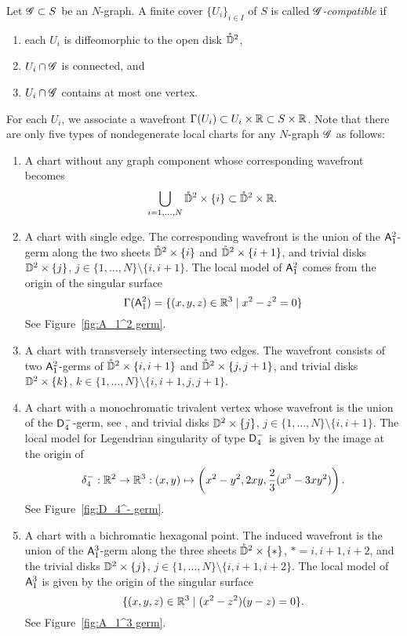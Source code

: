 Let $\mathscr{G}\subset S$ be an $N$-graph.
A finite cover $\{U_i\}_{i\in I}$ of $S$ is called {\em $\mathscr{G}$-compatible} if
\begin{enumerate}
\item each $U_i$ is diffeomorphic to the open disk $\mathring{\mathbb{D}}^2$,
\item $U_i \cap \mathscr{G}$ is connected, and
\item $U_i \cap \mathscr{G}$ contains at most one vertex.
\end{enumerate}

For each $U_i$, we associate a wavefront $\Gamma(U_i)\subset U_i\times \mathbb{R} \subset S\times \mathbb{R}$.
Note that there are only five types of nondegenerate local charts for any $N$-graph $\mathscr{G}$ as follows:
\begin{enumerate}[Type 1]
\item A chart without any graph component whose corresponding wavefront becomes
\[
\bigcup_{i=1,\dots,N}\mathring{\mathbb{D}}^2\times\{i\}\subset \mathring{\mathbb{D}}^2\times \mathbb{R}.
\]

\item A chart with single edge. The corresponding wavefront is the union of the $\mathsf{A}_1^2$-germ along the two sheets $\mathring{\mathbb{D}}^2\times \{i\}$ and $\mathring{\mathbb{D}}^2\times\{i+1\}$, and trivial disks $\mathbb{D}^2\times\{j\}$, $j\in \{1,\dots,N\}\setminus\{i,i+1\}$.%
The local model of $\mathsf{A}_1^2$ comes from the origin of the singular surface
\[
\Gamma(\mathsf{A}_1^2)=\{(x,y,z)\in \mathbb{R}^3 \mid x^2-z^2=0\}
\]
See Figure~\ref{fig:A_1^2 germ}.

\item A chart with transversely intersecting two edges. The wavefront consists of two $\mathsf{A}_1^2$-germs of $\mathring{\mathbb{D}}^2\times\{i,i+1\}$ and $\mathring{\mathbb{D}}^2\times\{j,j+1\}$, and trivial disks $\mathbb{D}^2\times\{k\}$, $k\in \{1,\dots,N\}\setminus\{i,i+1,j,j+1\}$.

\item A chart with a monochromatic trivalent vertex whose wavefront is the union of the $\mathsf{D}_4^-$-germ, see \cite[\S2.4]{Arn1990}, and trivial disks $\mathbb{D}^2\times\{j\}$, $j\in \{1,\dots,N\}\setminus\{i,i+1\}$.
The local model for Legendrian singularity of type $\mathsf{D}_4^-$ is given by the image at the origin of 
\begin{align*}
\delta_4^-:\mathbb{R}^2\to \mathbb{R}^3:(x,y)\mapsto \left( x^2-y^2, 2xy, \frac{2}{3}(x^3-3xy^2) \right).
\end{align*}
See Figure~\ref{fig:D_4^- germ}.

\item A chart with a bichromatic hexagonal point. The induced wavefront is the union of the $\mathsf{A}_1^3$-germ along the three sheets $\mathring{\mathbb{D}}^2\times \{*\}$, $*=i,i+1,i+2$, and the trivial disks $\mathbb{D}^2\times\{j\}$, $j\in \{1,\dots,N\}\setminus\{i,i+1,i+2\}$. The local model of $\mathsf{A}_1^3$ is given by the origin of the singular surface
\[
\{(x,y,z)\in \mathbb{R}^3 \mid (x^2-z^2)(y-z)=0\}.
\]
See Figure~\ref{fig:A_1^3 germ}.
\end{enumerate}


